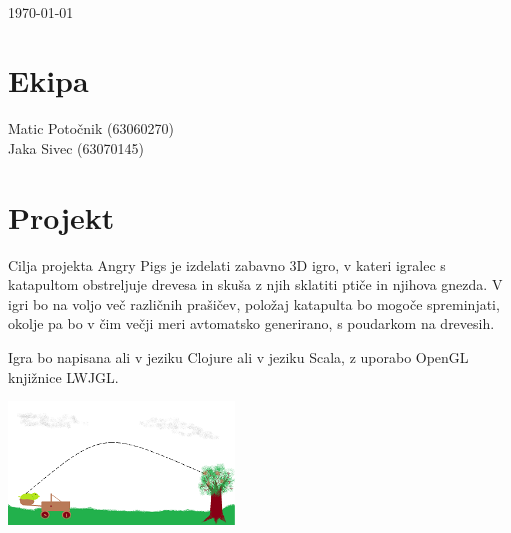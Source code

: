 \documentclass{article}
\begin{document}
\begin{center}
{}\\[0.5cm]
{\huge \today}\ \\[2cm]
\end{center}
\section{Ekipa}
{\large Matic Potočnik (63060270)}\\
{\large Jaka Sivec (63070145)}
\section{Projekt}
Cilja projekta Angry Pigs je izdelati zabavno 3D igro, v kateri igralec s katapultom obstreljuje drevesa in skuša z njih sklatiti ptiče in njihova gnezda. V igri bo na voljo več različnih prašičev, položaj katapulta bo mogoče spreminjati, okolje pa bo v čim večji meri avtomatsko generirano, s poudarkom na drevesih.

Igra bo napisana ali v jeziku Clojure ali v jeziku Scala, z uporabo OpenGL knjižnice LWJGL.\\
\begin{center}
\includegraphics[width=6cm]{conceptsmall}
\end{center}
\end{document}
